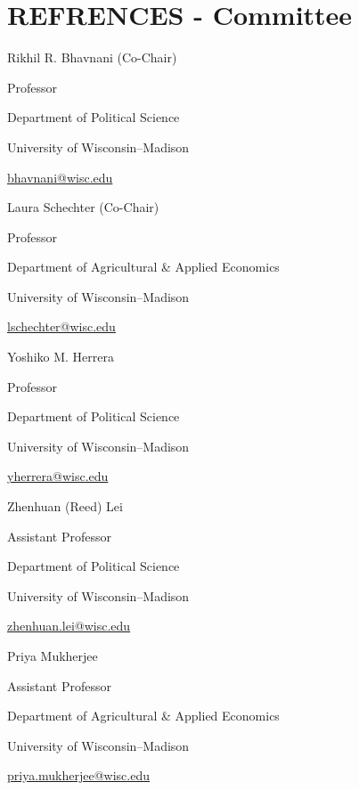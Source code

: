 \documentclass[10pt,letterpaper]{article}
\renewenvironment{itemize}{
  \begin{list}{}{
      \setlength{\leftmargin}{1.5em}
      \setlength{\itemsep}{0.25em}
      \setlength{\parskip}{0pt}
      \setlength{\parsep}{0.25em}
    }
}{
  \end{list}
}
\begin{document}
\section*{REFRENCES - Committee}
\begin{itemize}

\item Rikhil R. Bhavnani (Co-Chair)
 \begin{itemize}
\item Professor
\item Department of Political Science 
\item University of Wisconsin--Madison
\item \href{mailto:bhavnani@wisc.edu}{bhavnani@wisc.edu} \\
\end{itemize}

\item Laura Schechter (Co-Chair)
 \begin{itemize}
\item Professor
\item Department of Agricultural \& Applied Economics
\item University of Wisconsin--Madison
\item \href{mailto:lschechter@wisc.edu}{lschechter@wisc.edu} \\
\end{itemize}


\item Yoshiko M. Herrera
 \begin{itemize}
\item Professor
\item Department of Political Science 
\item University of Wisconsin--Madison
\item \href{mailto:yherrera@wisc.edu}{yherrera@wisc.edu} \\
\end{itemize}

\item Zhenhuan (Reed) Lei
 \begin{itemize}
\item Assistant Professor
\item Department of Political Science 
\item University of Wisconsin--Madison
\item \href{mailto:zhenhuan.lei@wisc.edu}{zhenhuan.lei@wisc.edu} \\
\end{itemize}

\item Priya Mukherjee
 \begin{itemize}
\item Assistant Professor
\item Department of Agricultural \& Applied Economics
\item University of Wisconsin--Madison
\item \href{mailto:priya.mukherjee@wisc.edu}{priya.mukherjee@wisc.edu} \\




\end{itemize}





\end{itemize}
\end{document}
